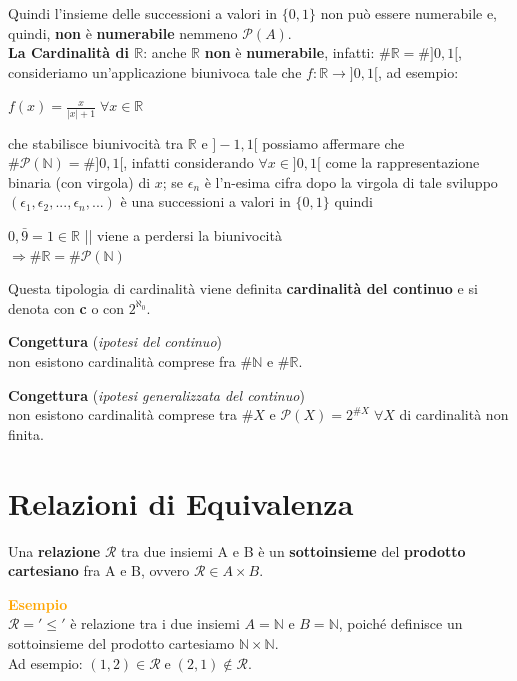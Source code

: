 Quindi l'insieme delle successioni a valori in $\{0, 1\}$  non può essere numerabile e, quindi, \textbf{non} è \textbf{numerabile} nemmeno $\mathcal{P}(A)$. \\ \newline
\textbf{La Cardinalità di $\mathbb{R}$}: anche $\mathbb{R}$ \textbf{non} è \textbf{numerabile}, infatti: $\#\mathbb{R} = \# ]0,1[$, consideriamo un'applicazione biunivoca tale che $f : \mathbb{R} \rightarrow ]0,1[$, ad esempio:
\begin{center}
    $f(x) = \frac{x}{ |x| + 1 } \; \forall x \in \mathbb{R}$
\end{center}
che stabilisce biunivocità tra $\mathbb{R}$ e $] -1, 1[$ possiamo affermare che $\#\mathcal{P}(\mathbb{N}) = \#]0,1[$, infatti considerando $\forall x \in ]0, 1[$ come la rappresentazione binaria (con virgola) di $x$; se $\epsilon_n$ è l'n-esima cifra dopo la virgola di tale sviluppo $(\epsilon_1, \epsilon_2, ..., \epsilon_n, ...)$ è una successioni a valori in $\{0, 1\}$ quindi
\begin{center}
    $0,\bar{9} = 1 \in \mathbb{R}$ || viene a perdersi la biunivocità \\
    $\Rightarrow \#\mathbb{R} = \# \mathcal{P}(\mathbb{N})$
\end{center}
Questa tipologia di cardinalità viene definita \textbf{cardinalità del continuo} e si denota con \textbf{c} o con $2^{\aleph_0}$.
\begin{boxA}
    \centering
    \textbf{Congettura} (\textit{ipotesi del continuo}) \\ 
    non esistono cardinalità comprese fra $\#\mathbb{N}$ e $\#\mathbb{R} $.
\end{boxA}
\begin{boxA}
    \centering
    \textbf{Congettura} (\textit{ipotesi generalizzata del continuo}) \\
    non esistono cardinalità comprese tra $\#X$ e $\mathcal{P}(X) = 2^{\#X} \; \forall X$ di cardinalità non finita.
\end{boxA}

\newpage
\section{Relazioni di Equivalenza}
Una \textbf{relazione} $\mathcal{R}$ tra due insiemi A e B è un \textbf{sottoinsieme} del \textbf{prodotto cartesiano} fra A e B, ovvero $\mathcal{R} \in A \times B$.
\begin{boxA}
    \textcolor{orange}{\textbf{Esempio}} \\
    $\mathcal{R} = '\leq'$ è relazione tra i due insiemi $A = \mathbb{N}$ e $B = \mathbb{N}$, poiché definisce un sottoinsieme del prodotto cartesiamo $\mathbb{N} \times \mathbb{N}$. \\
    Ad esempio: $(1, 2) \in \mathcal{R} \; \text{e} \; (2, 1) \notin \mathcal{R}$.
\end{boxA}

